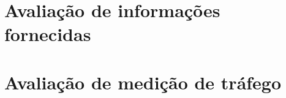 \section{Avaliação de informações fornecidas}
\label{avalia-info}

\section{Avaliação de medição de tráfego}
\label{avalia-trafego}

%
%
%
%
%
%
%
%
%
%
